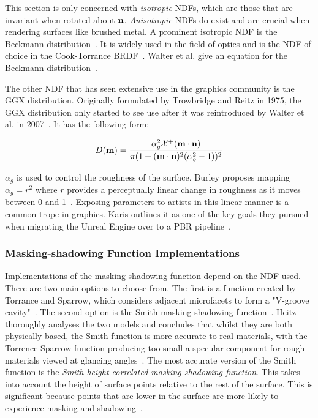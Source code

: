 This section is only concerned with \textit{isotropic} NDFs, which are those that are invariant when rotated about \begin{math}\mathbf{n}\end{math}. \textit{Anisotropic} NDFs do exist and are crucial when rendering surfaces like brushed metal. A prominent isotropic NDF is the Beckmann distribution~\cite{Beckmann}. It is widely used in the field of optics and is the NDF of choice in the Cook-Torrance BRDF~\cite{WalterRefraction, CookTorrance}. Walter et al. give an equation for the Beckmann distribution~\cite{WalterRefraction}.

The other NDF that has seen extensive use in the graphics community is the GGX distribution. Originally formulated by Trowbridge and Reitz in 1975, the GGX distribution only started to see use after it was reintroduced by Walter et al. in 2007~\cite{TrowbridgeAndReitz, WalterRefraction}. It has the following form:

\begin{equation} \label{eq:GGX}
	D(\mathbf{m}) = \frac{\alpha_g^2\mathcal{X}^+(\mathbf{m}\cdot\mathbf{n})}{\pi(1 + (\mathbf{m}\cdot\mathbf{n})^2(\alpha_g^2 - 1))^2}
\end{equation}

\begin{math}\alpha_g\end{math} is used to control the roughness of the surface. Burley proposes mapping \begin{math}\alpha_g = r^2\end{math} where \begin{math}r\end{math} provides a perceptually linear change in roughness as it moves between 0 and 1~\cite{Burley2012Physically}. Exposing parameters to artists in this linear manner is a common trope in graphics. Karis outlines it as one of the key goals they pursued when migrating the Unreal Engine over to a PBR pipeline~\cite{RealShadingInUnreal}.

\subsubsection{Masking-shadowing Function Implementations}

Implementations of the masking-shadowing function depend on the NDF used. There are two main options to choose from. The first is a function created by Torrance and Sparrow, which considers adjacent microfacets to form a "V-groove cavity"~\cite{TorranceSparrowVCavity}. The second option is the Smith masking-shadowing function~\cite{SmithMaskingShadowingFunction}. Heitz thoroughly analyses the two models and concludes that whilst they are both physically based, the Smith function is more accurate to real materials, with the Torrence-Sparrow function producing too small a specular component for rough materials viewed at glancing angles~\cite{HeitzMicrofacetTheory}. The most accurate version of the Smith function is the \textit{Smith height-correlated masking-shadowing function}. This takes into account the height of surface points relative to the rest of the surface. This is significant because points that are lower in the surface are more likely to experience masking and shadowing~\cite{RTR4}.

